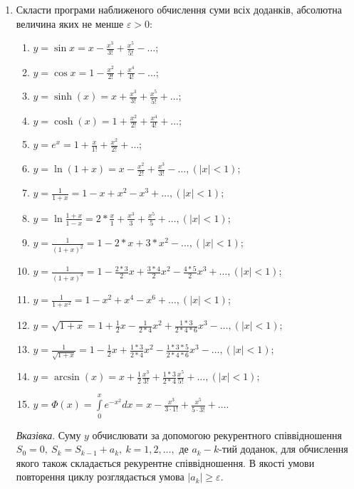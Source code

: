 \documentclass[]{article}
\makeatletter
\newcommand{\xslalph}[1]{\expandafter\@xslalph\csname c@#1\endcsname}
\newcommand{\@xslalph}[1]{%
    \ifcase#1\or а\or б\or в\or г\or д\or e\or є\or ж\or з\or i%
    \or й\or к\or л\or м\or н\or о\or п\or р\or с\or т%
    \or у\or ф\or х\or ц\or ч\or ш\or ю\or я\or аа\or бб\or вв %
    \else\@ctrerr\fi%
}
\makeatother
\begin{document}
\begin{enumerate}
\item
  Скласти програми наближеного обчислення суми всіх доданків, абсолютна
  величина яких не менше $\varepsilon > 0 $:
\begin{enumerate}[label=\xslalph*)]
\item \(y = \sin x = x - \frac{x^{3}}{3!} + \frac{x^{5}}{5!} - \ldots\);
\item \(y = \cos x = 1 - \frac{x^{2}}{2!} + \frac{x^{4}}{4!} - \ldots\);
\item
\(y = \sinh (x) = x + \frac{x^{3}}{3!} + \frac{x^{5}}{5!} + \ldots\);
\item 
\(y = \cosh (x) = 1 + \frac{x^{2}}{2!} + \frac{x^{4}}{4!} + \ldots\);
\item \(y = e^{x} = 1 + \frac{x}{1!} + \frac{x^{2}}{2!} + \ldots\);
\item
\(y = \ln(1 + x) = x - \frac{x^{2}}{2!} + \frac{x^{3}}{3!} - \ldots,(\left| x \right| < 1)\);
\item
\(y = \frac{1}{1 + x} = 1 - x + x^{2} - x^{3} + \ldots,(\left| x \right| < 1)\);
\item
\(y = \ln\frac{1 + x}{1 - x} = 2*\frac{x}{1} + \frac{x^{3}}{3} + \frac{x^{5}}{5} + \ldots, (\left| x \right| < 1)\);
\item
\(y = \frac{1}{(1 + x)^{2}} = 1 - 2*x + 3*x^{2} - \ldots,(\left| x \right| < 1)\);
\item
\(y = \frac{1}{(1 + x)^{3}} = 1 - \frac{2*3}{2}x + \frac{3*4}{2}x^{2} - \frac{4*5}{2}x^{3} + \ldots,(\left| x \right| < 1)\);
\item
\(y = \frac{1}{1 + x^{2}} = 1 - x^{2} + x^{4} - x^{6} + \ldots,(\left| x \right| < 1)\);
\item
\(y = \sqrt{1 + x} = 1 + \frac{1}{2}x - \frac{1}{2*4}x^{2} + \frac{1*3}{2*4*6}x^{3} - \ldots,(\left| x \right| < 1)\);
\item
\(y = \frac{1}{\sqrt{1 + x}} = 1 - \frac{1}{2}x + \frac{1*3}{2*4}x^{2} - \frac{1*3*5}{2*4*6}x^{3} - \ldots,(\left| x \right| < 1)\);
\item
\(y = \arcsin (x) = x + \frac{1}{2}\frac{x^{3}}{3!} + \frac{1*3}{2*4}\frac{x^{5}}{5!} + \ldots,(\left| x \right| < 1)\);
\item
\(y = \Phi (x) = \int\limits_{0}^{x} e^{-x^{2}} dx = x - \frac{x^{3}}{3 \cdot 1!} + \frac{ x^{5}}{5 \cdot 3!} + \ldots \).

\end{enumerate}

\emph{\emph{Вказівка}}. Суму $y$ обчислювати за допомогою
рекурентного співвідношення
\(S_{0} = 0,\ S_{k} = S_{k - 1} + a_{k},\ k = 1,2,\ldots,\) де
\(a_{k} - k\)-тий доданок, для обчислення якого також складається
рекурентне співвідношення. В якості умови повторення циклу розглядається
умова \(\left| a_{k} \right| \geq \varepsilon.\)


\end{enumerate}
\end{document}
